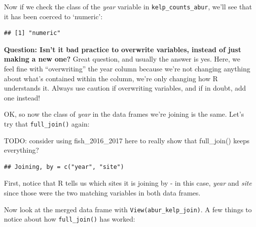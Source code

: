 \documentclass[]{book}
\newenvironment{Shaded}{\begin{snugshade}}{\end{snugshade}}
\newcommand{\DecValTok}[1]{\textcolor[rgb]{0.00,0.00,0.81}{#1}}
\newcommand{\KeywordTok}[1]{\textcolor[rgb]{0.13,0.29,0.53}{\textbf{#1}}}
\newcommand{\NormalTok}[1]{#1}
\newcommand{\OperatorTok}[1]{\textcolor[rgb]{0.81,0.36,0.00}{\textbf{#1}}}
\newcommand{\StringTok}[1]{\textcolor[rgb]{0.31,0.60,0.02}{#1}}
\begin{document}
Now if we check the class of the \emph{year} variable in \texttt{kelp\_counts\_abur}, we'll see that it has been coerced to `numeric':

\begin{Shaded}
\end{Shaded}

\begin{verbatim}
## [1] "numeric"
\end{verbatim}

\textbf{Question: Isn't it bad practice to overwrite variables, instead of just making a new one?} Great question, and usually the answer is yes. Here, we feel fine with ``overwriting'' the year column because we're not changing anything about what's contained within the column, we're only changing how R understands it. Always use caution if overwriting variables, and if in doubt, add one instead!

OK, so now the class of \emph{year} in the data frames we're joining is the same. Let's try that \texttt{full\_join()} again:

TODO: consider using fish\_2016\_2017 here to really show that full\_join() keeps everything?

\begin{Shaded}
\end{Shaded}

\begin{verbatim}
## Joining, by = c("year", "site")
\end{verbatim}

First, notice that R tells us which sites it is joining by - in this case, \emph{year} and \emph{site} since those were the two matching variables in both data frames.

Now look at the merged data frame with \texttt{View(abur\_kelp\_join)}. A few things to notice about how \texttt{full\_join()} has worked:
\end{document}
